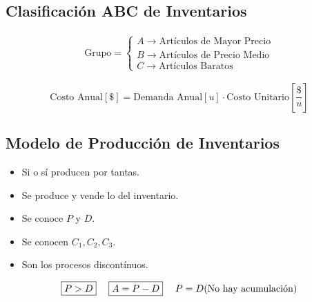\documentclass[10pt,letterpaper]{article}
\begin{document}
\subsection{Clasificación ABC de Inventarios}
\noindent
\begin{minipage}[t]{.5\textwidth}
\raggedright
\begin{align*}
\text{Grupo}=
\begin{cases}
A \rightarrow \text{Artículos de Mayor Precio} \\
B \rightarrow \text{Artículos de Precio Medio} \\
C \rightarrow \text{Artículos Baratos}
\end{cases}
\end{align*}
\end{minipage}%
\begin{minipage}[t]{.5\textwidth}
\raggedright
$$
\text{Costo Anual}[\$] = \text{Demanda Anual}[u]\cdot \text{Costo Unitario}\left[ \frac{\$}{u}\right]
$$
\end{minipage}
\subsection{Modelo de Producción de Inventarios}
\begin{itemize}
\item Si o sí producen por tantas.
\item Se produce y vende lo del inventario.
\item Se conoce $P$ y $D$.
\item Se conocen $C_1,C_2,C_3$.
\item Son los procesos discontínuos.
\end{itemize}
\begin{align*}
\boxed{P > D} &\hspace{0.1cm} & \boxed{A=P-D} & \hspace{0.1cm} & P=D (\text{No hay acumulación)}
\end{align*}
\end{document}
